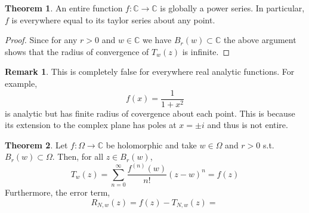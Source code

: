 \documentclass[12pt]{extarticle}
\newcommand{\C}{\mathbb{C}}
\theoremstyle{definition}
\newtheorem{theorem}{Theorem}[section]
\newtheorem{remark}{Remark}
\begin{document}
\begin{theorem}
An entire function $f : \C \to \C$ is globally a power series. In particular, $f$ is everywhere equal to its taylor series about any point. 
\end{theorem}

\begin{proof}
Since for any $r > 0$ and $w \in \C$ we have $B_r(w) \subset \C$ the above argument shows that the radius of convergence of $T_w(z)$ is infinite. 
\end{proof}

\begin{remark}
This is completely false for everywhere real analytic functions. For example,
\[ f(x) = \frac{1}{1 + x^2} \]
is analytic but has finite radius of covergence about each point. This is because its extension to the complex plane has poles at $x = \pm i$ and thus is not entire. 
\end{remark}

\begin{theorem}
Let $f : \Omega \to \C$ be holomorphic and take $w \in \Omega$ and $r > 0$ s.t. $B_r(w) \subset \Omega$. Then, for all $z \in B_r(w)$,
\[ T_w(z) = \sum_{n = 0}^\infty \frac{f^{(n)}(w)}{n!} (z - w)^n = f(z) \]
Furthermore, the error term,
\[ R_{N, w}(z) = f(z) - T_{N, w}(z) = \frac{}{} \]
\end{theorem}
\end{document}
